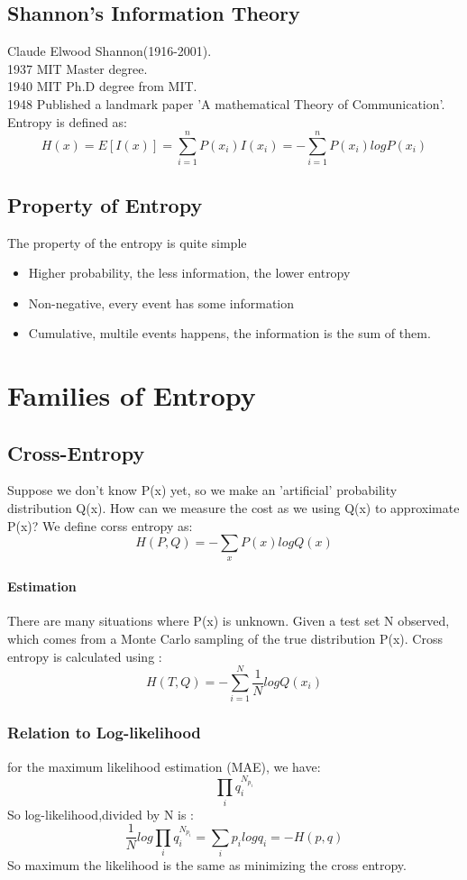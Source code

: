 \documentclass{article}
\begin{document}
\subsection{Shannon's Information Theory}
Claude Elwood Shannon(1916-2001).\\
1937 MIT Master degree.\\
1940 MIT Ph.D degree from MIT. \\
1948 Published a landmark paper 'A mathematical Theory of Communication'.\\
Entropy is defined as:
$$H(x)=E[I(x)]=\sum_{i=1}^{n}P(x_{i})I(x_{i})=-\sum_{i=1}^{n}P(x_{i})logP(x_{i})$$
\subsection{Property of Entropy}
The property of the entropy is quite simple
\begin{itemize}
\item Higher probability, the less information, the lower entropy
\item Non-negative, every event has some information
\item Cumulative, multile events happens, the information is the sum of them.
\end{itemize}
\section{Families of Entropy}
\subsection{Cross-Entropy}
Suppose we don't know P(x) yet, so we make an 'artificial' probability distribution Q(x). How can we measure the cost as we using Q(x) to approximate P(x)? We define corss entropy as:
$$H(P,Q)=-\sum_{x}P(x)logQ(x)$$

\paragraph{Estimation} There are many situations where P(x) is unknown. Given a test set N observed, which comes from a Monte Carlo sampling of the true distribution P(x). Cross entropy is calculated using :
$$H(T,Q)=-\sum_{i=1}^{N}\frac{1}{N}logQ(x_{i})$$
\subsubsection{Relation to Log-likelihood}
for the maximum likelihood estimation (MAE), we have:
$$\prod_{i}q_{i}^{N_{p_{i}}}$$ 
So log-likelihood,divided by N is :
$$\frac{1}{N}log\prod_{i}q_{i}^{N_{p_{i}}}=\sum_{i}p_{i}logq_{i}=-H(p,q)$$
So maximum the likelihood is the same as minimizing the cross entropy.
\end{document}
